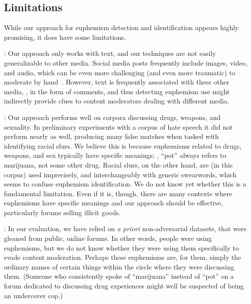 \subsection{Limitations} 
While our approach for euphemism detection and identification
appears highly promising,
it does have some limitations.

\medskip 
{}: 
Our approach only works with text, and our techniques
are not easily generalizable to other media.
Social media posts frequently include images, video, and audio,
which can be even more challenging (and even more traumatic)
to moderate by hand~\cite{TheVerge:Mods, TheVerge:Mods2, Ofcom:AI2019}.
However, text is frequently associated with these other media, 
\eg, in the form of comments, and thus detecting euphemism use might 
indirectly provide clues to content moderators dealing with 
different media. 

\medskip
{}:
Our approach performs well
on corpora discussing drugs, weapons, and sexuality.
In preliminary experiments
with a corpus of hate speech
it did not perform nearly as well,
producing many false matches
when tasked with identifying racial slurs.
We believe this is because
euphemisms related to drugs, weapons, and sex
typically have specific meanings;
\eg, ``pot'' always refers to marijuana, not some other drug.
Racial slurs, on the other hand,
are (in this corpus)
used imprecisely, and interchangeably with generic swearwords,
which seems to confuse euphemism identification.
We do not know yet whether this is a fundamental limitation.
Even if it is, though,
there are many  contexts where euphemisms have specific meanings
and our approach should be effective,  particularly forums selling illicit goods.

\medskip
{}: 
In our evaluation, we have relied on \textit{a priori} 
non-adversarial datasets, 
that were gleaned from public, online forums. 
In other words, people were using euphemisms, 
but we do not know whether they were using them
specifically to evade content moderation.
Perhaps these euphemisms are, for them,
simply the ordinary names of certain things
within the circle where they were discussing them.
(Someone who consistently spoke of ``marijuana'' instead of ``pot''
on a forum dedicated to discussing drug experiences
might well be suspected of being an undercover cop.)

